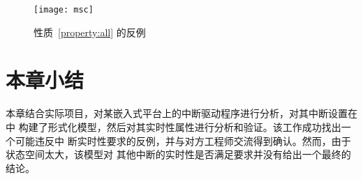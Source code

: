 \begin{figure}[H]
	\centering
	\texttt{[image: msc]}
	\caption{性质~\ref{property:all} 的反例}
	\label{fig:exp_counter}
\end{figure}

\section{本章小结}
\label{sec:sum_4}

本章结合实际项目，对某嵌入式平台上的中断驱动程序进行分析，对其中断设置在\uppaal 中
构建了形式化模型，然后对其实时性属性进行分析和验证。该工作成功找出一个可能违反中
断实时性要求的反例，并与对方工程师交流得到确认。然而，由于状态空间太大，该模型对
其他中断的实时性是否满足要求并没有给出一个最终的结论。